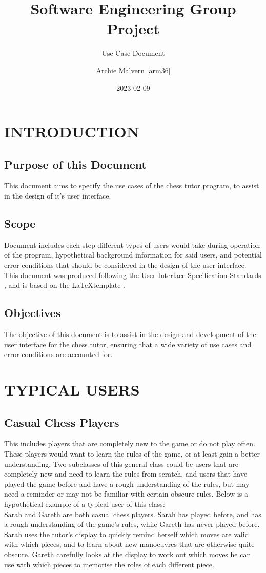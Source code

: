 \documentclass{project}
\begin{document}
\title{Software Engineering Group Project}
\subtitle{Use Case Document}
\author{Archie Malvern [arm36]}     
\date{2023-02-09}
\maketitle
\tableofcontents
\newpage
\section{INTRODUCTION}
\subsection{Purpose of this Document}
This document aims to specify the use cases of the chess tutor program, to assist in the design of it’s user interface.
\subsection{Scope}
Document includes each step different types of users would take during operation of the program, hypothetical background information for said users, and potential error conditions that should be considered in the design of the user interface.
This document was produced following the User Interface Specification Standards \cite{se.qa.04}, and is based on the \LaTeX template \cite{SE-N66-TEST}.
\subsection{Objectives}
The objective of this document is to assist in the design and development of the user interface for the chess tutor, ensuring that a wide variety of use cases and error conditions are accounted for.
\section{TYPICAL USERS}
\subsection{Casual Chess Players}
This includes players that are completely new to the game or do not play often. These players would want to learn the rules of the game, or at least gain a better understanding. Two subclasses of this general class could be users that are completely new and need to learn the rules from scratch, and users that have played the game before and have a rough understanding of the rules, but may need a reminder or may not be familiar with certain obscure rules. Below is a hypothetical example of a typical user of this class:\\
Sarah and Gareth are both casual chess players. Sarah has played before, and has a rough understanding of the game’s rules, while Gareth has never played before. Sarah uses the tutor’s display to quickly remind herself which moves are valid with which pieces, and to learn about new manoeuvres that are otherwise quite obscure. Gareth carefully looks at the display to work out which moves he can use with which pieces to memorise the roles of each different piece.
\end{document}
